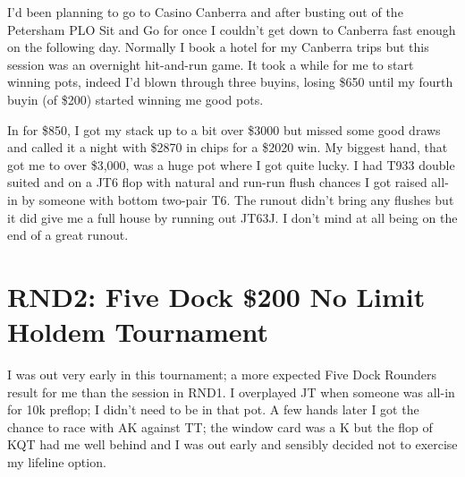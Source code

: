 I'd been planning to go to Casino Canberra and after busting out of
the Petersham PLO Sit and Go for once I couldn't get down to Canberra
fast enough on the following day. Normally I book a hotel for my
Canberra trips but this session was an overnight hit-and-run game. It
took a while for me to start winning pots, indeed I'd blown through
three buyins, losing \$650 until my fourth buyin (of \$200) started
winning me good pots.

In for \$850, I got my stack up to a bit over \$3000 but missed some
good draws and called it a night with \$2870 in chips for a \$2020
win. My biggest hand, that got me to over \$3,000, was a huge pot
where I got quite lucky. I had T933 double suited and on a JT6 flop
with natural and run-run flush chances I got raised all-in by someone
with bottom two-pair T6. The runout didn't bring any flushes but it
did give me a full house by running out JT63J. I don't mind at all
being on the end of a great runout.

\section*{RND2: Five Dock \$200 No Limit Holdem Tournament}

I was out very early in this tournament; a more expected Five Dock
Rounders result for me than the session in RND1. I overplayed JT when
someone was all-in for 10k preflop; I didn't need to be in that pot.
A few hands later I got the chance to race with AK against TT; the
window card was a K but the flop of KQT had me well behind and I was
out early and sensibly decided not to exercise my lifeline option.
